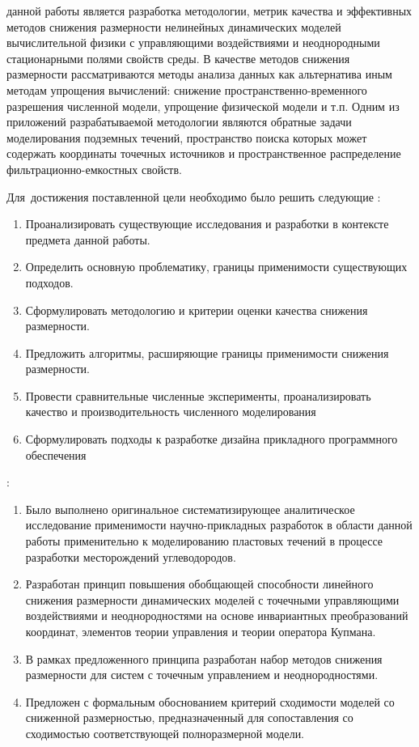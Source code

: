 {\progress} 

{\aim} данной работы является разработка методологии, метрик качества и эффективных методов снижения размерности нелинейных динамических моделей вычислительной физики с управляющими воздействиями и неоднородными стационарными полями свойств среды.
В качестве методов снижения размерности рассматриваются методы анализа данных как альтернатива иным методам упрощения вычислений: снижение пространственно-временного разрешения численной модели, упрощение физической модели и т.п.
Одним из приложений разрабатываемой методологии являются обратные задачи моделирования подземных течений, пространство поиска которых может содержать координаты точечных источников и пространственное распределение фильтрационно-емкостных свойств.

Для~достижения поставленной цели необходимо было решить следующие {\tasks}:
\begin{enumerate}[beginpenalty=10000] %
  \item Проанализировать существующие исследования и разработки в контексте предмета данной работы.
  \item Определить основную проблематику, границы применимости существующих подходов.
  \item Сформулировать методологию и критерии оценки качества снижения размерности.
  \item Предложить алгоритмы, расширяющие границы применимости снижения размерности.
  \item Провести сравнительные численные эксперименты, проанализировать качество и производительность численного моделирования
  \item Сформулировать подходы к разработке дизайна прикладного программного обеспечения
\end{enumerate}

{\novelty}:
\begin{enumerate}[beginpenalty=10000] %
  \item Было выполнено оригинальное систематизирующее аналитическое исследование применимости научно-прикладных разработок в области данной работы применительно к моделированию пластовых течений в процессе разработки месторождений углеводородов.
  \item Разработан принцип повышения обобщающей способности линейного снижения размерности динамических моделей с точечными управляющими воздействиями и неоднородностями на основе инвариантных преобразований координат, элементов теории управления и теории оператора Купмана.
  \item В рамках предложенного принципа разработан набор методов снижения размерности для систем с точечным управлением и неоднородностями.
  \item Предложен с формальным обоснованием критерий сходимости моделей со сниженной размерностью, предназначенный для сопоставления со сходимостью соответствующей полноразмерной модели.
\end{enumerate}

